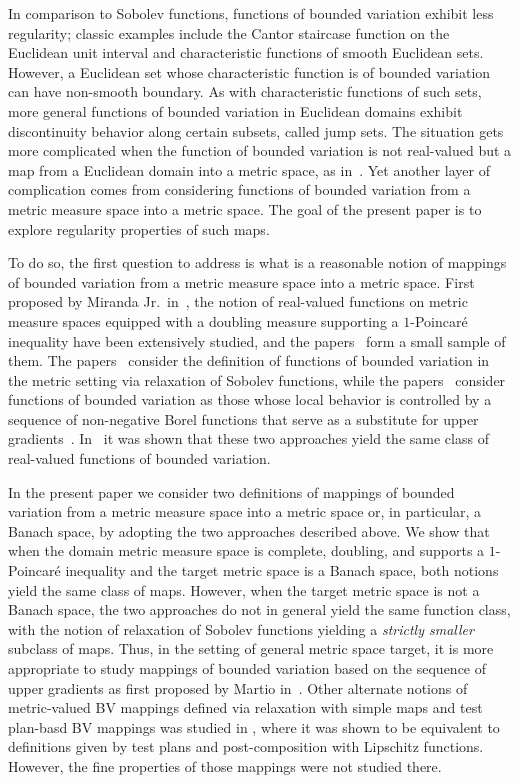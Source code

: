 \documentclass[11pt, letterpaper]{amsart} %
\numberwithin{equation}{section}
\theoremstyle{plain}
\theoremstyle{definition}
\begin{document}
{In comparison to Sobolev functions, functions of bounded variation exhibit less regularity; classic examples
include the Cantor staircase function on the Euclidean unit interval and characteristic functions of smooth Euclidean sets.
However, a Euclidean set whose characteristic function is of bounded variation can have non-smooth boundary.
As with characteristic functions of such sets, more general functions of bounded variation in Euclidean domains
exhibit discontinuity behavior along certain subsets, called jump sets. The situation gets more complicated when the
function of bounded variation is not real-valued but a map from a Euclidean domain into a metric space, as
in~\cite{Ambrosio1990-II}. Yet another layer of complication comes from considering functions of bounded 
variation from a metric measure space into a metric space. The goal of the present paper is to explore regularity properties
of such maps.

To do so, the first question to address is what is a reasonable notion of mappings of bounded variation from a metric 
measure space into a metric space. First proposed by Miranda Jr.~in~\cite{Miranda}, the notion of real-valued functions
on metric measure spaces equipped with a doubling measure supporting a $1$-Poincar\'e inequality have been extensively
studied, and the papers~\cite{Ambrosio, AMP, DEKS, EGLS, HKMM, HMM-1, HMM-2, HMM-3, 
Lah-Fed, LSh1, LZ} form a small sample of them. The papers~\cite{Miranda, Ambrosio, AMP, EGLS, LSh1} consider
the definition of functions of bounded variation in the metric setting via relaxation of Sobolev functions, while 
the papers~\cite{HKMM, HMM-1, HMM-2, HMM-3} consider functions of bounded variation as those whose local behavior
is controlled by a sequence of non-negative Borel functions that serve as a substitute for upper 
gradients~\cite{Martio}. In~\cite{DEKS} it was shown that these two approaches yield the same 
class of real-valued functions of bounded variation.

In the present paper we consider two definitions of mappings of bounded variation from a metric measure space into a
metric space or, in particular, a Banach space, by adopting the two approaches described above. We show that
when the domain metric measure space is complete, doubling, and supports a $1$-Poincar\'e inequality and the target metric
space is a Banach space, both notions yield the same class of maps. However, when the target metric space is not
a Banach space, the two approaches do not in general yield the same function class, with the notion of relaxation of 
Sobolev functions yielding a \emph{strictly smaller} subclass of maps. Thus, in the setting of general metric space target,
it is more appropriate to study mappings of bounded variation based on the sequence of upper gradients as first proposed
by Martio in~\cite{Martio}. Other alternate notions of 
metric-valued BV mappings defined via relaxation with simple maps and test plan-basd BV 
mappings was studied in \cite{BNP}, where it was shown to be equivalent to definitions given by 
test plans and post-composition with Lipschitz functions.  However, the fine properties of those mappings were not studied there.

}
\end{document}
